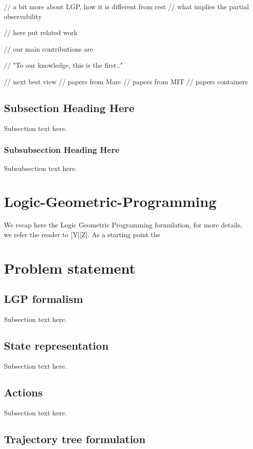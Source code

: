 // a bit more about LGP, how it is different from rest
// what implies the partial observability

// here put related work

// our main contributions are

// "To our knowledge, this is the first.."

// next best view
// papers from Marc
// papers from MIT
// papers containers

\subsection{Subsection Heading Here}
Subsection text here.

\subsubsection{Subsubsection Heading Here}
Subsubsection text here.

\section{Logic-Geometric-Programming}
We recap here the Logic Geometric Programming formulation, for more details, we refer the reader to [Y][Z]. As a starting point the 

\section{Problem statement}

\subsection{LGP formalism}
Subsection text here.

\subsection{State representation}
Subsection text here.

\subsection{Actions}
Subsection text here.

\subsection{Trajectory tree formulation}

